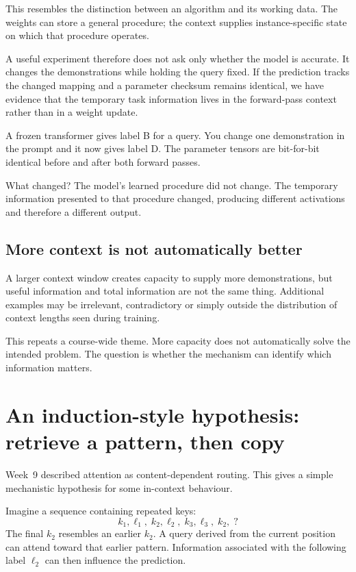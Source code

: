 This resembles the distinction between an algorithm and its working data. The weights can store a general procedure; the context supplies instance-specific state on which that procedure operates.

A useful experiment therefore does not ask only whether the model is accurate. It changes the demonstrations while holding the query fixed. If the prediction tracks the changed mapping and a parameter checksum remains identical, we have evidence that the temporary task information lives in the forward-pass context rather than in a weight update.

\begin{checkpointbox}
A frozen transformer gives label B for a query. You change one demonstration in the prompt and it now gives label D. The parameter tensors are bit-for-bit identical before and after both forward passes.

What changed? The model's learned procedure did not change. The temporary information presented to that procedure changed, producing different activations and therefore a different output.
\end{checkpointbox}

\subsection{More context is not automatically better}

A larger context window creates capacity to supply more demonstrations, but useful information and total information are not the same thing. Additional examples may be irrelevant, contradictory or simply outside the distribution of context lengths seen during training.

This repeats a course-wide theme. More capacity does not automatically solve the intended problem. The question is whether the mechanism can identify which information matters.

\section{An induction-style hypothesis: retrieve a pattern, then copy}

Week~9 described attention as content-dependent routing. This gives a simple mechanistic hypothesis for some in-context behaviour.

Imagine a sequence containing repeated keys:
\[
  k_1,\ell_1,\;k_2,\ell_2,\;k_3,\ell_3,\;k_2,\;?
\]
The final \(k_2\) resembles an earlier \(k_2\). A query derived from the current position can attend toward that earlier pattern. Information associated with the following label \(\ell_2\) can then influence the prediction.

